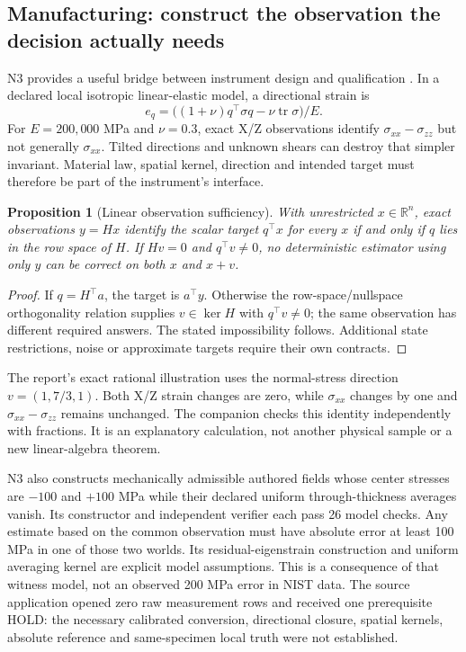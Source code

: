 \documentclass[11pt,letterpaper]{article}
\newtheorem{proposition}{Proposition}\newtheorem{definition}{Definition}
\begin{document}
\subsection{Manufacturing: construct the observation the decision actually needs}
N3 provides a useful bridge between instrument design and qualification \cite{nextseries}. In a declared local isotropic linear-elastic model, a directional strain is
\begin{equation}
e_q=\big((1+\nu)q^\top\sigma q-\nu\operatorname{tr}\sigma\big)/E.
\end{equation}
For $E=200{,}000$ MPa and $\nu=0.3$, exact X/Z observations identify $\sigma_{xx}-\sigma_{zz}$ but not generally $\sigma_{xx}$. Tilted directions and unknown shears can destroy that simpler invariant. Material law, spatial kernel, direction and intended target must therefore be part of the instrument's interface.

\begin{proposition}[Linear observation sufficiency]
With unrestricted $x\in\mathbb R^n$, exact observations $y=Hx$ identify the scalar target $q^\top x$ for every $x$ if and only if $q$ lies in the row space of $H$. If $Hv=0$ and $q^\top v\ne0$, no deterministic estimator using only $y$ can be correct on both $x$ and $x+v$.
\end{proposition}
\begin{proof}
If $q=H^\top a$, the target is $a^\top y$. Otherwise the row-space/nullspace orthogonality relation supplies $v\in\ker H$ with $q^\top v\ne0$; the same observation has different required answers. The stated impossibility follows. Additional state restrictions, noise or approximate targets require their own contracts.
\end{proof}

The report's exact rational illustration uses the normal-stress direction $v=(1,7/3,1)$. Both X/Z strain changes are zero, while $\sigma_{xx}$ changes by one and $\sigma_{xx}-\sigma_{zz}$ remains unchanged. The companion checks this identity independently with fractions. It is an explanatory calculation, not another physical sample or a new linear-algebra theorem.

N3 also constructs mechanically admissible authored fields whose center stresses are $-100$ and $+100$ MPa while their declared uniform through-thickness averages vanish. Its constructor and independent verifier each pass 26 model checks. Any estimate based on the common observation must have absolute error at least 100 MPa in one of those two worlds. Its residual-eigenstrain construction and uniform averaging kernel are explicit model assumptions. This is a consequence of that witness model, not an observed 200 MPa error in NIST data. The source application opened zero raw measurement rows and received one prerequisite HOLD: the necessary calibrated conversion, directional closure, spatial kernels, absolute reference and same-specimen local truth were not established.
\end{document}
